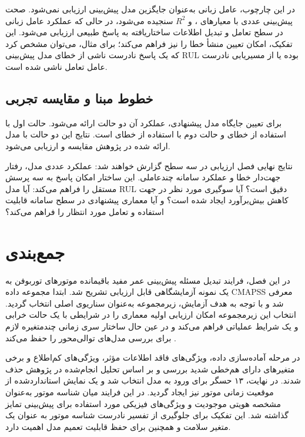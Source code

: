 در این چارچوب، عامل زبانی به‌عنوان جایگزین مدل پیش‌بینی ارزیابی
نمی‌شود. صحت پیش‌بینی عددی با معیارهای
 ،
  و
$R^2$ 
 سنجیده می‌شود، در حالی که عملکرد عامل زبانی
در سطح تعامل و تبدیل اطلاعات ساختاریافته به پاسخ طبیعی ارزیابی
می‌شود. این تفکیک، امکان تعیین منشأ خطا را نیز فراهم می‌کند؛
برای مثال، می‌توان مشخص کرد که یک پاسخ نادرست ناشی از خطای
مدل پیش‌بینی \gls{RUL} بوده یا از مسیریابی نادرست عامل تعامل ناشی شده است.

\subsection{خطوط مبنا و مقایسه تجربی}
\label{sec:baselines}
برای تعیین جایگاه مدل پیشنهادی، عملکرد آن دو حالت ارائه می‌شود. حالت اول با استفاده از خطای 
و حالت دوم با استفاده از خطای 
است. نتایج این دو حالت با مدل 
ارائه شده در پژوهش \cite{Mo2023} مقایسه و ارزیابی می‌شود.

نتایج نهایی فصل ارزیابی در سه سطح گزارش خواهند شد: عملکرد عددی
مدل، رفتار جهت‌دار خطا و عملکرد سامانه چندعاملی. این ساختار
امکان پاسخ به سه پرسش مستقل را فراهم می‌کند: آیا مدل \gls{RUL}
دقیق است؟ آیا سوگیری مورد نظر در جهت کاهش بیش‌برآورد ایجاد شده
است؟ و آیا معماری پیشنهادی در سطح سامانه قابلیت استفاده و تعامل
مورد انتظار را فراهم می‌کند؟






\section{جمع‌بندی}
\label{sec:chap3-summary}

در این فصل، فرایند تبدیل مسئله پیش‌بینی عمر مفید باقیمانده موتورهای
توربوفن به یک نمونه آزمایشگاهی قابل ارزیابی تشریح شد. ابتدا مجموعه
داده \gls{CMAPSS} معرفی شد و با توجه به هدف آزمایش، زیرمجموعه
 به‌عنوان سناریوی اصلی انتخاب گردید. انتخاب این
زیرمجموعه امکان ارزیابی اولیه معماری را در شرایطی با یک حالت
خرابی و یک شرایط عملیاتی فراهم می‌کند و در عین حال ساختار
سری زمانی چندمتغیره لازم برای بررسی مدل‌های توالی‌محور را حفظ
می‌کند \cite{NASA2007C-MAPSS}.

در مرحله آماده‌سازی داده، ویژگی‌های فاقد اطلاعات مؤثر، ویژگی‌های
کم‌اطلاع و برخی متغیرهای دارای هم‌خطی شدید بررسی و بر اساس تحلیل
انجام‌شده در پژوهش حذف شدند. در نهایت، ۱۳ حسگر برای ورود به مدل
انتخاب شد و یک نمایش استانداردشده از موقعیت زمانی موتور نیز ایجاد
گردید. در این فرایند میان شناسه موتور به‌عنوان مشخصه هویتی
موجودیت و ویژگی‌های فیزیکی مورد استفاده برای پیش‌بینی تمایز
گذاشته شد. این تفکیک برای جلوگیری از تفسیر نادرست شناسه موتور به
عنوان یک متغیر سلامت و همچنین برای حفظ قابلیت تعمیم مدل اهمیت
دارد.

